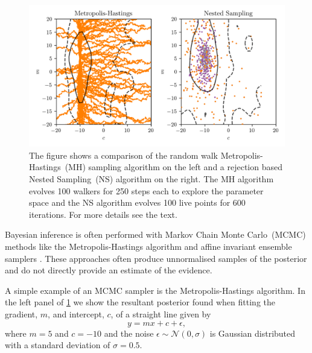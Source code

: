 \begin{figure}
    \centering
    \includegraphics{introduction/figs/sampling_comparison.png}
    \caption{The figure shows a comparison of the random walk Metropolis-Hastings~(MH) sampling algorithm on the left and a rejection based Nested Sampling~(NS) algorithm on the right. The MH algorithm evolves 100 walkers for 250 steps each to explore the parameter space and the NS algorithm evolves 100 live points for 600 iterations. For more details see the text.}
    \label{fig:sampling_comparison}
\end{figure}

Bayesian inference is often performed with Markov Chain Monte Carlo~(MCMC) methods like the Metropolis-Hastings algorithm \cite{Hastings_MCMC_1970} and affine invariant ensemble samplers \cite{Foreman_Mackey_2013}. These approaches often produce unnormalised samples of the posterior and do not directly provide an estimate of the evidence.

A simple example of an MCMC sampler is the Metropolis-Hastings algorithm. In the left panel of \cref{fig:sampling_comparison} we show the resultant posterior found when fitting the gradient, $m$, and intercept, $c$, of a straight line given by
\begin{equation}
    y = mx + c + \epsilon,
\end{equation}
where $m = 5$ and $c=-10$ and the noise $\epsilon \sim \mathcal{N}(0, \sigma)$ is Gaussian distributed with a standard deviation of $\sigma = 0.5$.


